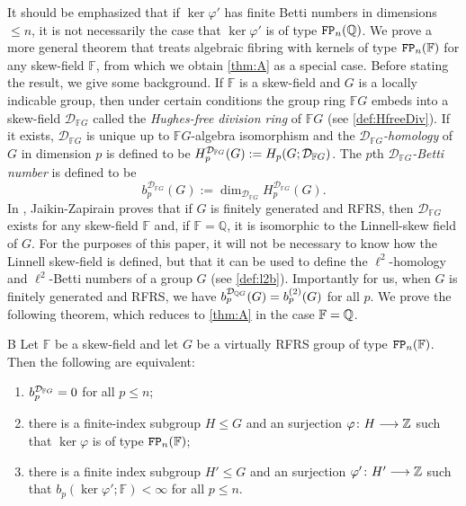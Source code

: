 \documentclass[11pt, letterpaper]{amsart}
\begin{document}
It should be emphasized that if $\ker \varphi'$ has finite Betti numbers in dimensions $\leqslant n$, it is not necessarily the case that $\ker \varphi'$ is of type $\mathtt{FP}_n(\mathbb{Q})$. We prove a more general theorem that treats algebraic fibring with kernels of type $\mathtt{FP}_n(\mathbb F)$ for any skew-field $\mathbb F$, from which we obtain \cref{thm:A} as a special case.  Before stating the result, we give some background. If $\mathbb{F}$ is a skew-field and $G$ is a locally indicable group, then under certain conditions the group ring $\mathbb{F}G$ embeds into a skew-field $\mathcal{D}_{\mathbb{F}G}$ called the \textit{Hughes-free division ring} of $\mathbb{F}G$ (see \cref{def:HfreeDiv}). If it exists, $\mathcal{D}_{\mathbb{F}G}$ is unique up to $\mathbb{F}G$-algebra isomorphism \cite{HughesDivRings1970} and the \textit{$\mathcal{D}_{\mathbb{F}G}$-homology} of $G$ in dimension $p$ is defined to be $H_p^{\mathcal{D}_{\mathbb F{G}}}(G) := H_p(G; \mathcal{D}_{\mathbb F{G}})$. The $p$th \textit{$\mathcal{D}_{\mathbb{F}G}$-Betti number} is defined to be
\[
    b_p^{\mathcal{D}_{\mathbb{F}G}}(G) := \dim_{\mathcal{D}_{\mathbb{F}G}} H_p^{\mathcal{D}_{\mathbb{F}G}} (G).
\]
In \cite[Corollary 1.3]{JaikinZapirain2020THEUO}, Jaikin-Zapirain proves that if $G$ is finitely generated and RFRS, then $\mathcal{D}_{\mathbb{F}G}$ exists for any skew-field $\mathbb{F}$ and, if $\mathbb{F} = \mathbb{Q}$, it is isomorphic to the Linnell-skew field of $G$. For the purposes of this paper, it will not be necessary to know how the Linnell skew-field is defined, but that it can be used to define the $\ell^2$-homology and $\ell^2$-Betti numbers of a group $G$ (see \cref{def:l2b}). Importantly for us, when $G$ is finitely generated and RFRS, we have $b_p^{\mathcal{D}_{\mathbb{Q} G}} (G) = b_p^{(2)}(G)$ for all $p$. We prove the following theorem, which reduces to \cref{thm:A} in the case $\mathbb F = \mathbb{Q}$.

\begin{manualtheorem}{B}\label{thm:B}
    Let $\mathbb{F}$ be a skew-field and let $G$ be a virtually RFRS group of type $\mathtt{FP}_n(\mathbb F)$. Then the following are equivalent:
    \begin{enumerate}
        \item $b_p^{\mathcal{D}_{\mathbb F{G}}} = 0$ for all $p \leqslant n$;
        \item there is a finite-index subgroup $H \leqslant G$ and an surjection $\varphi \colon H \longrightarrow \mathbb{Z}$ such that $\ker \varphi$ is of type $\mathtt{FP}_n(\mathbb F)$;
        \item there is a finite index subgroup $H' \leqslant G$ and an surjection $\varphi' \colon H' \longrightarrow \mathbb{Z}$ such that $b_p(\ker \varphi'; \mathbb F) < \infty$ for all $p \leqslant n$.
    \end{enumerate}
\end{manualtheorem}
\end{document}
